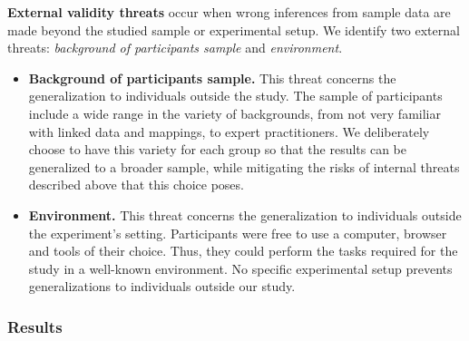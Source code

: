 \textbf{External validity threats} occur when wrong inferences from sample data are made beyond the studied sample or experimental setup. We identify two external threats: \textit{background of participants sample} and \textit{environment}.
\begin{itemize}
    \item \textbf{Background of participants sample.} This threat concerns the generalization to individuals outside the study. The sample of participants include a wide range in the variety of backgrounds, from not very familiar with linked data and mappings, to expert practitioners. We deliberately choose to have this variety for each group so that the results can be generalized to a broader sample, while mitigating the risks of internal threats described above that this choice poses. 
    \item \textbf{Environment.} This threat concerns the generalization to individuals outside the experiment’s setting. Participants were free to use a computer, browser and tools of their choice. Thus, they could perform the tasks required for the study in a well-known environment. No specific experimental setup prevents generalizations to individuals outside our study.
\end{itemize}




\subsubsection{Results}
\label{sec:chp5_mapeathor_results}



